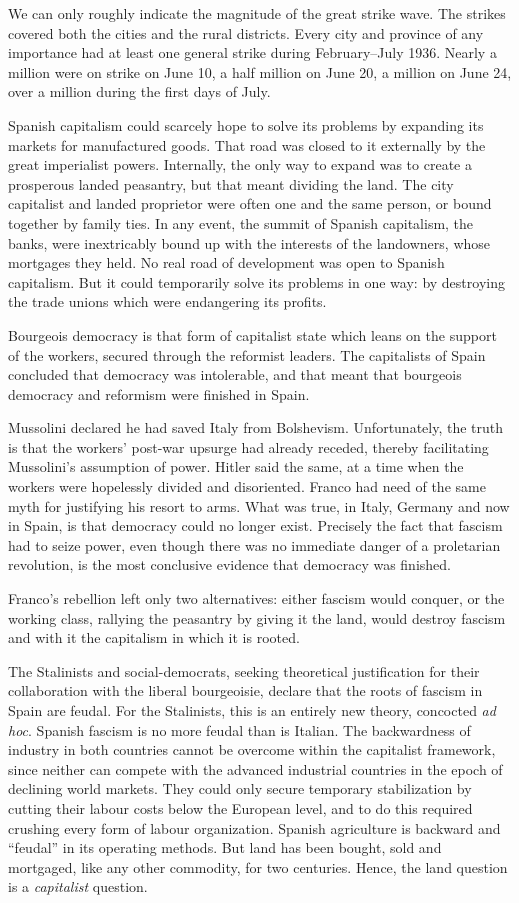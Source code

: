 We can only roughly indicate the magnitude of the great strike wave. The strikes covered both the cities and the rural districts. Every city and province of any importance had at least one general strike during February--July 1936. Nearly a million were on strike on June 10, a half million on June 20, a million on June 24, over a million during the first days of July.

Spanish capitalism could scarcely hope to solve its problems by expanding its markets for manufactured goods. That road was closed to it externally by the great imperialist powers. Internally, the only way to expand was to create a prosperous landed peasantry, but that meant dividing the land. The city capitalist and landed proprietor were often one and the same person, or bound together by family ties. In any event, the summit of Spanish capitalism, the banks, were inextricably bound up with the interests of the landowners, whose mortgages they held. No real road of development was open to Spanish capitalism. But it could temporarily solve its problems in one way: by destroying the trade unions which were endangering its profits.

Bourgeois democracy is that form of capitalist state which leans on the support of the workers, secured through the reformist leaders. The capitalists of Spain concluded that democracy was intolerable, and that meant that bourgeois democracy and reformism were finished in Spain.

Mussolini declared he had saved Italy from Bolshevism. Unfortunately, the truth is that the workers’ post-war upsurge had already receded, thereby facilitating Mussolini’s assumption of power. Hitler said the same, at a time when the workers were hopelessly divided and disoriented. Franco had need of the same myth for justifying his resort to arms. What was true, in Italy, Germany and now in Spain, is that democracy could no longer exist. Precisely the fact that fascism had to seize power, even though there was no immediate danger of a proletarian revolution, is the most conclusive evidence that democracy was finished.

Franco’s rebellion left only two alternatives: either fascism would conquer, or the working class, rallying the peasantry by giving it the land, would destroy fascism and with it the capitalism in which it is rooted.

The Stalinists and social-democrats, seeking theoretical justification for their collaboration with the liberal bourgeoisie, declare that the roots of fascism in Spain are feudal. For the Stalinists, this is an entirely new theory, concocted \emph{ad hoc}. Spanish fascism is no more feudal than is Italian. The backwardness of industry in both countries cannot be overcome within the capitalist framework, since neither can compete with the advanced industrial countries in the epoch of declining world markets. They could only secure temporary stabilization by cutting their labour costs below the European level, and to do this required crushing every form of labour organization. Spanish agriculture is backward and ``feudal'' in its operating methods. But land has been bought, sold and mortgaged, like any other commodity, for two centuries. Hence, the land question is a \emph{capitalist} question.
\noclub


